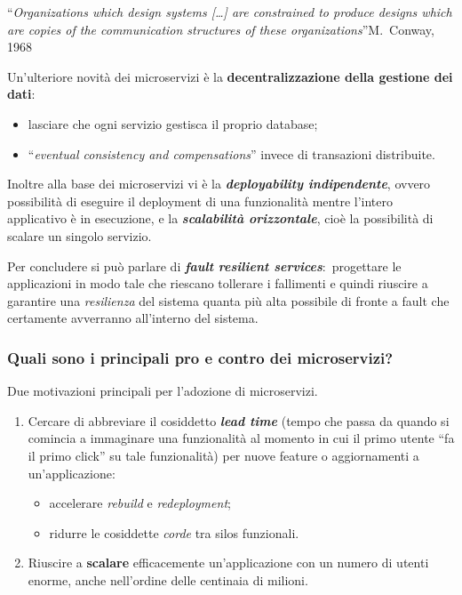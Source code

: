 \documentclass[12pt, a4paper]{article}
\begin{document}
\begin{flushleft}
``\textit{Organizations which design systems [\dots] are constrained to produce designs which are copies of the communication structures of these organizations}''\qquad M.\ Conway, 1968
\end{flushleft}

\noindent Un'ulteriore novità dei microservizi è la \textbf{decentralizzazione della gestione dei dati}:\
\begin{itemize}
	\item lasciare che ogni servizio gestisca il proprio database;
	\item ``\textit{eventual consistency and compensations}'' invece di transazioni distribuite.
\end{itemize}

\noindent Inoltre alla base dei microservizi vi è la \textbf{\textit{deployability indipendente}}, ovvero possibilità di eseguire il deployment di una funzionalità mentre l'intero applicativo è in esecuzione, e la \textbf{\textit{scalabilità orizzontale}}, cioè la possibilità di scalare un singolo servizio.\

Per concludere si può parlare di \textbf{\textit{fault resilient services}}:\ progettare le applicazioni in modo tale che riescano tollerare i fallimenti e quindi riuscire a garantire una \textit{resilienza} del sistema quanta più alta possibile di fronte a fault che certamente avverranno all'interno del sistema.\

\subsubsection*{Quali sono i principali pro e contro dei microservizi?}


Due motivazioni principali per l'adozione di microservizi.\

\begin{enumerate}
	\item Cercare di abbreviare il cosiddetto \textbf{\textit{lead time}} (tempo che passa da quando si comincia a immaginare una funzionalità al momento in cui il primo utente ``fa il primo click'' su tale funzionalità) per nuove feature o aggiornamenti a un'applicazione:
	\begin{itemize}
		\item accelerare \textit{rebuild} e \textit{redeployment};
		\item ridurre le cosiddette \textit{corde} tra silos funzionali.
	\end{itemize}
	\item Riuscire a \textbf{scalare} efficacemente un'applicazione con un numero di utenti enorme, anche nell'ordine delle centinaia di milioni.\
\end{enumerate}
\end{document}
